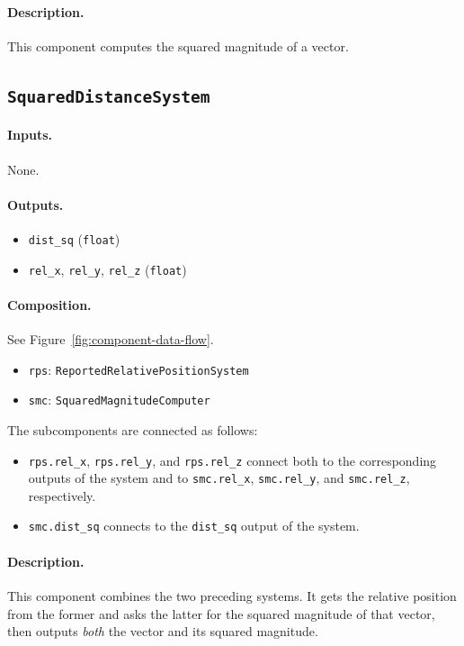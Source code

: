 \documentclass{article}
\begin{document}
\paragraph{Description.} This component computes the squared magnitude of a vector.

\subsection{\texttt{SquaredDistanceSystem}}

\paragraph{Inputs.} None.

\paragraph{Outputs.}
\begin{itemize}
    \item \verb|dist_sq| (\verb|float|)
    \item \verb|rel_x|, \verb|rel_y|, \verb|rel_z| (\verb|float|)
\end{itemize}

\paragraph{Composition.}
See Figure~\ref{fig:component-data-flow}.
\begin{itemize}
    \item \verb|rps|: \verb|ReportedRelativePositionSystem|
    \item \verb|smc|: \verb|SquaredMagnitudeComputer|
\end{itemize}
The subcomponents are connected as follows:
\begin{itemize}
    \item \verb|rps.rel_x|, \verb|rps.rel_y|, and \verb|rps.rel_z| connect both
          to the corresponding outputs of the system and to \verb|smc.rel_x|,
          \verb|smc.rel_y|, and \verb|smc.rel_z|, respectively.
    \item \verb|smc.dist_sq| connects to the \verb|dist_sq| output of the system.
\end{itemize}

\paragraph{Description.} This component combines the two preceding systems. It gets the relative position from the former and asks the latter for the squared magnitude of that vector, then outputs \textit{both} the vector and its squared magnitude. 
\end{document}
